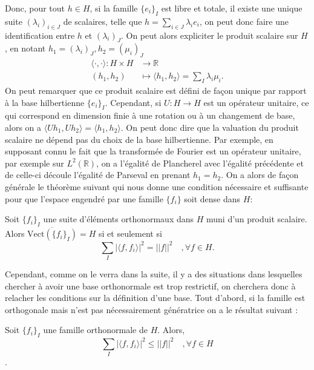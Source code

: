 Donc, pour tout $h \in H$, si la famille $\{e_i\}_I$ est libre et totale, il existe une unique suite $(\lambda_i)_{i \in J}$ de scalaires, telle que $ h = \sum_{i \in J} \lambda_i e_i$, on peut donc faire une identification entre $h$ et $(\lambda_i)_J$.
	On peut alors expliciter le produit scalaire sur $H$, en notant $h_1 = (\lambda_i)_J, h_2=(\mu_i)_J$
\begin{align}
	\langle \cdot, \cdot \rangle :  H \times H &\longrightarrow \mathbb{R} \\
		(h_1, h_2 ) &\longmapsto \langle h_1, h_2 \rangle = \sum_I \lambda_i \mu_i.
\end{align}
On peut remarquer que ce produit scalaire est défini de façon unique par rapport à la base hilbertienne $\{e_i\}_I$.
Cependant, si $U:H\rightarrow H$ est un opérateur unitaire, ce qui correspond en dimension finie à une rotation ou à un changement de base, alors on a $\langle Uh_1, Uh_2 \rangle = \langle h_1, h_2 \rangle$.
On peut donc dire que la valuation du produit scalaire ne dépend pas du choix de la base hilbertienne.
Par exemple,  en supposant connu le fait que la transformée de Fourier est un opérateur unitaire, par exemple sur $L^2(\mathbb{R})$, on a l'égalité de Plancherel avec l'égalité précédente et de celle-ci découle l'égalité de Parseval en prenant $h_1 = h_2$.
On a alors de façon générale le théorème suivant qui nous donne une condition nécessaire et suffisante pour que l'espace engendré par une famille $\{f_i\}$ soit dense dans $H$:
\begin{theoreme}
	Soit $\{f_i\}_I$ une suite d'éléments orthonormaux dans $H$ muni d'un produit scalaire.
	Alors $\overline{\text{Vect}(\{f_i\}_I)} = H$ si et seulement si 
	\begin{equation*}
		\sum_I |\langle f, f_i\rangle|^2 = ||f||^2 \quad, \forall f \in H.
	\end{equation*}
\end{theoreme}
Cependant, comme on le verra dans la suite, il y a des situations dans lesquelles chercher à avoir une base orthonormale est trop restrictif, on cherchera donc à relacher les conditions sur la définition d'une base.
\newline
Tout d'abord, si la famille est orthogonale mais n'est pas nécessairement génératrice on a le résultat suivant :
\begin{theoreme}\label{th:orth1}
	Soit $\{f_i\}_I$ une famille orthonormale de $H$.
	Alors,
	\begin{equation*}
		\sum_I |\langle f, f_i \rangle|^2 \leq ||f||^2 \quad, \forall f \in H
	\end{equation*}.
\end{theoreme}
